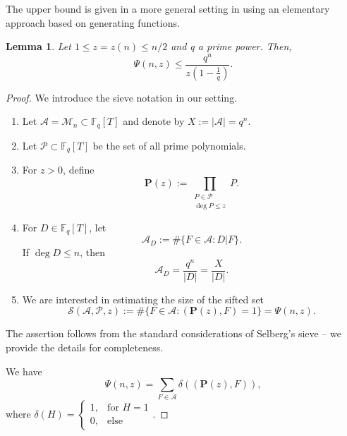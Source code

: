 \documentclass[12pt]{amsart}
\numberwithin{equation}{section}
\newtheorem{lemma}[theorem]{Lemma}
\theoremstyle{definition}
\theoremstyle{remark}
\newcommand{\FF}{\mathbb{F}}
\begin{document}
The upper bound is given in a more general setting in \cite[Lemma~3.5]{GorodetskyKovaleva} using an elementary approach based on generating functions. 


\begin{lemma}\label{lm:Sieve upper bound}
    Let $1\leq z=z(n) \leq n/2$ and q a prime power. Then,
    \[
    \Psi(n,z) \leq  \frac{q^n}{z(1-\frac{1}{q})}.
    \]    
\end{lemma}

\begin{proof}
    We introduce the sieve notation in our setting.
    \begin{enumerate}[label=\arabic*.]
        \item Let $\mathcal{A} = \mathcal{M}_n \subset \FF_q[T]$  and denote by $X := |\mathcal{A}| = q^n$. 
        \item Let $\mathcal{P} \subset \FF_q[T]$ be the set of all prime polynomials. 
        \item For $z>0$, define 
        \[
        \mathbf{P}(z) := \prod_{\substack{P\in \mathcal{P} \\ \deg P \leq z}} P.
        \]
        \item For $D \in \FF_q[T]$, let
        \[
            \mathcal{A}_D := \# \{F \in \mathcal{A}: D|F \}.
        \]
        If $\deg D \leq n$, then
        \begin{equation}\label{eq:size A_D}
            \mathcal{A}_D = \frac{q^n}{|D|} = \frac{X}{|D|}.
        \end{equation}
        \item We are interested in estimating the size of the sifted set
        \[
            \mathcal{S}(\mathcal{A}, \mathcal{P}, z) := \# \{F \in \mathcal{A}: (\mathbf{P}(z), F)  = 1 \} = \Psi(n,z).
        \]
    \end{enumerate}

    The assertion follows from the standard considerations of Selberg's sieve -- we provide the details for completeness.
    
    We have
    \[
        \Psi(n,z) =
        \sum_{F\in \mathcal{A}} \delta((\mathbf{P}(z),F)), 
    \]
    where $\delta(H) = \begin{cases}
            1, & \text{for } H=1\\
            0, & \text{else}
        \end{cases}$. 


\end{proof}
\end{document}
